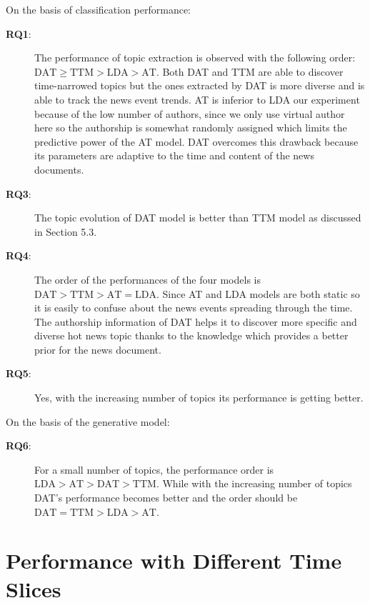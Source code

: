 \begin{description}
	\item On the basis of classification performance:
	\begin{description}
	\item[\textbf{RQ1}:] The performance of topic extraction is observed with the following order: $\text{DAT} \geq \text{TTM} > \text{LDA} > \text{AT}$. Both DAT and TTM are able to discover time-narrowed topics but the ones extracted by DAT is more diverse and is able to track the news event trends. AT is inferior to LDA our experiment because of the low number of authors, since we only use virtual author here so the authorship is somewhat randomly assigned which limits the predictive power of the AT model. DAT overcomes this drawback because its parameters are adaptive to the time and content of the news documents. 
	\item[\textbf{RQ3}:] The topic evolution of DAT model is better than TTM model as discussed in Section 5.3.
	\item[\textbf{RQ4}:] The order of the performances of the four models is  
	$\text{DAT} > \text{TTM} > \text{AT} = \text{LDA}$. Since AT and LDA models are both static so it is easily to confuse about the news events spreading through the time. The authorship information of DAT helps it to discover more specific and diverse hot news topic thanks to the knowledge which provides a better prior for the news document. 
	\item[\textbf{RQ5}:] Yes, with the increasing number of topics its performance is getting better.
	\end{description}
	\item On the basis of the generative model:
	\begin{description}
	\item[\textbf{RQ6}:] For a small number of topics, the performance order is	$\text{LDA} > \text{AT} > \text{DAT} > \text{TTM}$. While with the increasing number of topics DAT's performance becomes better and the order should be $\text{DAT} = \text{TTM} > \text{LDA} > \text{AT}$.
	\end{description}
\end{description}


\section{Performance with Different Time Slices}


